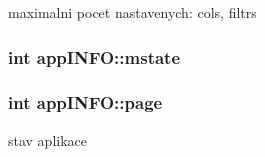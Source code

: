 maximalni pocet nastavenych\-: cols, filtrs 

\hypertarget{structappINFO_adfd6385ddf12d07eae63c0f6c2e35f56}{
\subsubsection[{mstate}]{\setlength{\rightskip}{0pt plus 5cm}int {\bf app\-I\-N\-F\-O\-::mstate}}}
\label{d3/d7d/structappINFO_adfd6385ddf12d07eae63c0f6c2e35f56}
\hypertarget{structappINFO_a3e71923aa543da9b106e9959dc4c67e7}{
\subsubsection[{page}]{\setlength{\rightskip}{0pt plus 5cm}int {\bf app\-I\-N\-F\-O\-::page}}}
\label{d3/d7d/structappINFO_a3e71923aa543da9b106e9959dc4c67e7}


stav aplikace 

